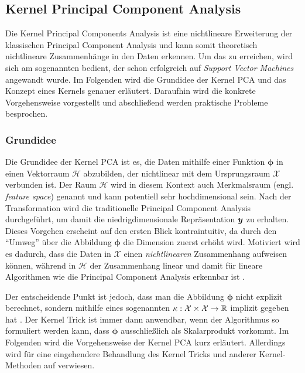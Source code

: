 \subsection{Kernel Principal Component Analysis}
\label{ch:MethodenDerDimRed:statistisch:kPCA}
Die Kernel Principal Components Analysis \parencite{Scholkopf.1997} ist eine nichtlineare Erweiterung der klassischen Principal Component
Analysis und kann somit theoretisch nichtlineare Zusammenhänge in den Daten erkennen. Um das zu
erreichen, wird sich am sogenannten  bedient, der schon erfolgreich auf
\textit{Support Vector Machines} \parencite{Boser.1992} angewandt wurde. Im Folgenden wird die Grundidee der Kernel PCA und das Konzept
eines Kernels genauer erläutert. Daraufhin wird die konkrete Vorgehensweise vorgestellt und
abschließend werden praktische Probleme besprochen.

\subsubsection{Grundidee}
\label{ch:MethodenDerDimRed:statistisch:kPCA:Grundidee}

Die Grundidee der Kernel PCA ist es, die Daten mithilfe einer Funktion $\bm{\phi}$ in einen
Vektorraum $\mathcal{H}$ abzubilden, der nichtlinear mit dem Ursprungsraum $\mathcal{X}$ verbunden
ist. Der Raum $\mathcal{H}$ wird in diesem Kontext auch Merkmalsraum (engl. \textit{feature space})
genannt und kann potentiell sehr hochdimensional sein. Nach der Transformation wird die
traditionelle Principal Component Analysis durchgeführt, um damit die niedrigdimensionale
Repräsentation $\bm{y}$ zu erhalten. Dieses Vorgehen erscheint auf den ersten Blick
kontraintuitiv, da durch den \enquote{Umweg} über die Abbildung $\bm{\phi}$ die Dimension zuerst
erhöht wird. Motiviert wird es dadurch, dass die Daten in $\mathcal{X}$ einen
\textit{nichtlinearen} Zusammenhang aufweisen können, während in $\mathcal{H}$ der Zusammenhang
linear und damit für lineare Algorithmen wie die Principal Component Analysis erkennbar ist \parencite[vgl.][26]{ShaweTaylor.2011}.

Der entscheidende Punkt ist jedoch, dass man die Abbildung $\bm{\phi}$ nicht explizit berechnet,
sondern mithilfe eines sogenannten  $\kappa: \mathcal{X} \times \mathcal{X}
	\rightarrow \mathbb{R}$ implizit gegeben hat \parencites[586 -- 588]{Bishop.2006}[583]{Scholkopf.1997}. Der Kernel Trick ist immer dann anwendbar,
wenn der Algorithmus so formuliert werden kann, dass $\bm{\phi}$ ausschließlich als Skalarprodukt
vorkommt. Im Folgenden wird die Vorgehensweise der Kernel PCA kurz erläutert. Allerdings wird für
eine eingehendere Behandlung des Kernel Tricks und anderer Kernel-Methoden auf
\textcite{ShaweTaylor.2011} verwiesen.

